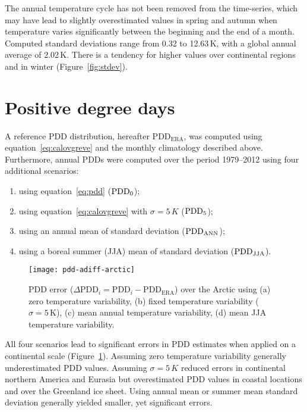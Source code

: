 \documentclass[review]{igs}
\begin{document}
The annual temperature cycle has not been removed from the time-series, which may have lead to slightly overestimated values in spring and autumn when temperature varies significantly between the beginning and the end of a month. Computed standard deviations range from 0.32 to 12.63\,K, with a global annual average of 2.02\,K. There is a tendency for higher values over continental regions and in winter (Figure~\ref{fig:stdev}).


\section{Positive degree days}

A reference PDD distribution, hereafter $\mathrm{PDD_{ERA}}$, was computed using equation~\ref{eq:calovgreve} and the monthly climatology described above. Furthermore, annual PDDs were computed over the period 1979--2012 using four additional scenarios:

\begin{enumerate}
  \item using equation~\ref{eq:pdd} ($\rm PDD_0$);
  \item using equation~\ref{eq:calovgreve} with $\sigma=5\,K$ ($\rm PDD_5$);
  \item using an annual mean of standard deviation ($\rm PDD_{ANN}$);
  \item using a boreal summer (JJA) mean of standard deviation ($\rm PDD_{JJA}$).
\end{enumerate}

\begin{figure}
  \centering\texttt{[image: pdd-adiff-arctic]}
  \caption{PDD error ($\Delta\mathrm{PDD}_i = \mathrm{PDD}_i - \mathrm{PDD_{ERA}}$) over the Arctic using (a) zero temperature variability, (b) fixed temperature variability ($\sigma=5\,\mathrm{K}$), (c) mean annual temperature variability, (d) mean JJA temperature variability.}
  \label{fig:pdd}
\end{figure}

All four scenarios lead to significant errors in PDD estimates when applied on a continental scale (Figure~\ref{fig:pdd}). Assuming zero temperature variability generally underestimated PDD values. Assuming $\sigma=5\,K$ reduced errors in continental northern America and Eurasia but overestimated PDD values in coastal locations and over the Greenland ice sheet. Using annual mean or summer mean standard deviation generally yielded smaller, yet significant errors.
\end{document}
